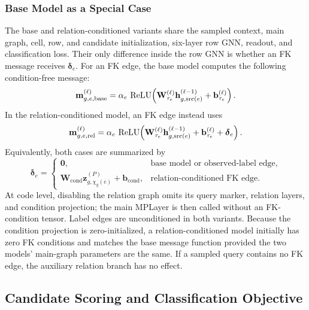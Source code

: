 \subsubsection{Base Model as a Special Case}
\label{sec:method:base-special-case}

The base and relation-conditioned variants share the sampled context, main
graph, cell, row, and candidate initialization, six-layer row GNN, readout, and
classification loss. Their only difference inside the row GNN is whether an
FK message receives \(\boldsymbol\delta_e\). For an FK edge, the base model
computes the following condition-free message:
\begin{equation}
  \mathbf m_{g,e,\mathrm{base}}^{(\ell)}
  =
  \alpha_e\,
  \operatorname{ReLU}\!\left(
    \mathbf W_{\tau_e}^{(\ell)}
    \mathbf h_{g,\operatorname{src}(e)}^{(\ell-1)}
    +\mathbf b_{\tau_e}^{(\ell)}
  \right).
\label{eq:method:base-message}
\end{equation}
In the relation-conditioned model, an FK edge instead uses
\begin{equation}
  \mathbf m_{g,e,\mathrm{rel}}^{(\ell)}
  =
  \alpha_e\,
  \operatorname{ReLU}\!\left(
    \mathbf W_{\tau_e}^{(\ell)}
    \mathbf h_{g,\operatorname{src}(e)}^{(\ell-1)}
    +\mathbf b_{\tau_e}^{(\ell)}
    +\boldsymbol\delta_e
  \right).
\label{eq:method:rel-message}
\end{equation}
Equivalently, both cases are summarized by
\begin{equation}
  \boldsymbol\delta_e
  =
  \begin{cases}
    \mathbf0,
      & \text{base model or observed-label edge},\\
    \mathbf W_{\mathrm{cond}}
      \mathbf z_{g,\chi_g(e)}^{(P)}+\mathbf b_{\mathrm{cond}},
      & \text{relation-conditioned FK edge}.
  \end{cases}
\label{eq:method:base-rel-condition}
\end{equation}
At code level, disabling the relation graph omits its query marker,
relation layers, and condition projection; the main MPLayer is then called
without an FK-condition tensor. Label edges are unconditioned in both
variants. Because the condition projection is zero-initialized, a
relation-conditioned model initially has zero FK conditions and matches the
base message function provided the two models' main-graph parameters are
the same. If a sampled query contains no FK edge, the auxiliary relation
branch has no effect.

\subsection{Candidate Scoring and Classification Objective}
\label{sec:method:classification-objective}

